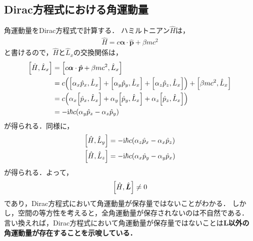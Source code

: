 \documentclass{report}
\begin{document}
  \subsection{Dirac方程式における角運動量}
    角運動量をDirac方程式で計算する．
    ハミルトニアン$\hat{H}$は，
    \begin{align}
      \hat{H} = c \bm{\alpha} \cdot \hat{\bm{p}} + \beta mc^2
    \end{align}
    と書けるので，$\hat{H}$と$\hat{L}_x$の交換関係は，
    \begin{align}
      \qty[\hat{H}, \hat{L}_x] &= \qty[c \bm{\alpha} \cdot \hat{\bm{p}} + \beta mc^2, \hat{L}_x]\\
      &= c\qty(\qty[\alpha_x \hat{p}_x, \hat{L}_x] + \qty[\alpha_y \hat{p}_y, \hat{L}_x] + \qty[\alpha_z \hat{p}_z, \hat{L}_x]) + \qty[\beta mc^2, \hat{L}_x]\\
      &= c\qty(\alpha_x\qty[\hat{p}_x, \hat{L}_x] + \alpha_y\qty[\hat{p}_y, \hat{L}_x] + \alpha_z\qty[\hat{p}_z, \hat{L}_x])\\
      &= -\mathrm{i}\hbar c \qty(\alpha_y \hat{p}_z - \alpha_z \hat{p}_y)
    \end{align}
    が得られる．同様に，
    \begin{align}
      \qty[\hat{H}, \hat{L}_y] &= -\mathrm{i}\hbar c \qty(\alpha_z \hat{p}_x - \alpha_x \hat{p}_z)\\
      \qty[\hat{H}, \hat{L}_z] &= -\mathrm{i}\hbar c \qty(\alpha_x \hat{p}_y - \alpha_y \hat{p}_x)
    \end{align}
    が得られる．よって，
    \begin{align}
      \qty[\hat{H}, \hat{\bm{L}}] \neq 0
    \end{align}
    であり，Dirac方程式において角運動量が保存量ではないことがわかる．
    しかし，空間の等方性を考えると，全角運動量が保存されないのは不自然である．
    言い換えれば，Dirac方程式において角運動量が保存量ではないことは\textbf{$\bm{L}$以外の角運動量が存在することを示唆している．}
  
\end{document}
